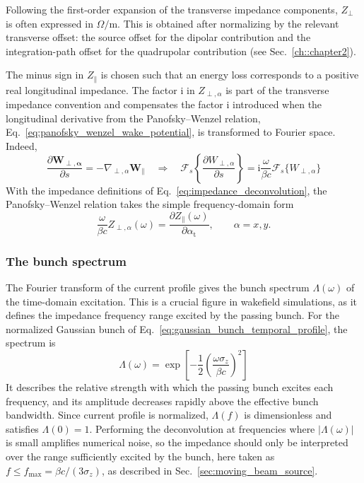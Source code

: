 Following the first-order expansion of the transverse impedance components, $Z_{\perp}$ is often expressed in $\Omega/\mathrm{m}$. This is obtained after normalizing by the relevant transverse offset: the source offset for the dipolar contribution and the integration-path offset for the quadrupolar contribution (see Sec.~\ref{ch::chapter2}).

The minus sign in $Z_{\parallel}$ is chosen such that an energy loss corresponds to a positive real longitudinal impedance. The factor $\mathrm{i}$ in $Z_{\perp,\alpha}$ is part of the transverse impedance convention and compensates the factor $\mathrm{i}$ introduced when the longitudinal derivative from the Panofsky--Wenzel relation, Eq.~\eqref{eq:panofsky_wenzel_wake_potential}, is transformed to Fourier space. Indeed,
%
\begin{equation}
\frac{\partial \boldsymbol{W_{\perp, \alpha}}}{\partial s} = -\nabla_{\perp, \alpha}\boldsymbol{W_{\parallel}} \quad \Rightarrow \quad
\mathcal{F}_s
\left\{
\frac{\partial W_{\perp,\alpha}}{\partial s}
\right\}
=
\mathrm{i}\frac{\omega}{\beta c}
\mathcal{F}_s\{W_{\perp,\alpha}\}
\end{equation}
%
With the impedance definitions of Eq.~\eqref{eq:impedance_deconvolution}, the Panofsky--Wenzel relation takes the simple frequency-domain form
%
\begin{equation}
\frac{\omega}{\beta c}Z_{\perp,\alpha}(\omega)
=
\frac{\partial Z_{\parallel}(\omega)}{\partial \alpha_{\mathrm{t}}},
\qquad
\alpha=x,y.
\label{eq:panofsky_wenzel_impedance}
\end{equation}
%
\subsubsection{The bunch spectrum}
The Fourier transform of the current profile gives the bunch spectrum $\Lambda(\omega)$ of the time-domain excitation. This is a crucial figure in wakefield simulations, as it defines the impedance frequency range excited by the passing bunch. For the normalized Gaussian bunch of Eq.~\eqref{eq:gaussian_bunch_temporal_profile}, the spectrum is
%
\begin{equation}
\Lambda(\omega)
=
\exp\left[
-\frac{1}{2}
\left(
\frac{\omega\sigma_z}{\beta c}
\right)^2
\right]
\label{eq:gaussian_bunch_spectrum}
\end{equation}
%
It describes the relative strength with which the passing bunch excites each frequency, and its amplitude decreases rapidly above the effective bunch bandwidth.  Since current profile is normalized, $\Lambda(f)$ is dimensionless and satisfies $\Lambda(0)=1$. Performing the deconvolution at frequencies where $\lvert\Lambda(\omega)\rvert$ is small amplifies numerical noise, so the impedance should only be interpreted over the range sufficiently excited by the bunch, here taken as $f\leq f_{\max}=\beta c/(3\sigma_z)$, as described in Sec.~\ref{sec:moving_beam_source}.

